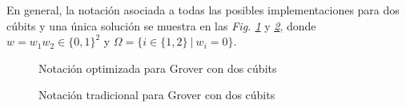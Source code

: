 \documentclass[10pt,conference,a4paper]{IEEEtran}
\begin{document}
En general, la notación asociada a todas las posibles implementaciones para dos cúbits y una única solución se muestra en las \textit{Fig. \ref{not:grover2gen}} y \textit{\ref{not:grover2gentrad}}, donde $w=w_1w_2\in\{0,1\}^2$ y $\Omega=\{i\in\{1,2\} \ |\ w_i=0\}$.

\begin{figure}[H]
\centering
{}
\caption{Notación optimizada para Grover con dos cúbits}
\label{not:grover2gen}
\end{figure}
\vspace{-4mm}

\begin{figure}[H]
\centering
{}
\end{figure}
\vspace{-8mm}
\begin{figure}[H]
\centering
{}
\end{figure}
\vspace{-8mm}
\begin{figure}[H]
\centering
{}
\end{figure}
\vspace{-8mm}
\begin{figure}[H]
\centering
{}
\caption{Notación tradicional para Grover con dos cúbits}
\label{not:grover2gentrad}
\end{figure}
\end{document}
